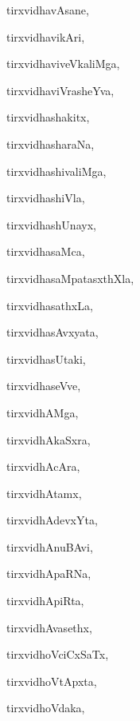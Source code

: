 \begin{multicols}{3}
{\noindent
{tirxvidhavAsane}, \pageref{tirxvidhavAsane}

\noindent
{tirxvidhavikAri}, \pageref{tirxvidhavikAri}

\noindent
{tirxvidhaviveVkaliMga}, \pageref{tirxvidhaviveVkaliMga}

\noindent
{tirxvidhaviVrasheYva}, \pageref{tirxvidhaviVrasheYva}

\noindent
{tirxvidhashakitx}, \pageref{tirxvidhashakitx}

\noindent
{tirxvidhasharaNa}, \pageref{tirxvidhasharaNa}

\noindent
{tirxvidhashivaliMga}, \pageref{tirxvidhashivaliMga}

\noindent
{tirxvidhashiVla}, \pageref{tirxvidhashiVla}

\noindent
{tirxvidhashUnayx}, \pageref{tirxvidhashUnayx}

\noindent
{tirxvidhasaMca}, \pageref{tirxvidhasaMca}

\noindent
{tirxvidhasaMpatasxthXla}, \pageref{tirxvidhasaMpatasxthXla}

\noindent
{tirxvidhasathxLa}, \pageref{tirxvidhasathxLa}

\noindent
{tirxvidhasAvxyata}, \pageref{tirxvidhasAvxyata}

\noindent
{tirxvidhasUtaki}, \pageref{tirxvidhasUtaki}

\noindent
{tirxvidhaseVve}, \pageref{tirxvidhaseVve}

\noindent
{tirxvidhAMga}, \pageref{tirxvidhAMga}

\noindent
{tirxvidhAkaSxra}, \pageref{tirxvidhAkaSxra}

\noindent
{tirxvidhAcAra}, \pageref{tirxvidhAcAra}

\noindent
{tirxvidhAtamx}, \pageref{tirxvidhAtamx}

\noindent
{tirxvidhAdevxYta}, \pageref{tirxvidhAdevxYta}

\noindent
{tirxvidhAnuBAvi}, \pageref{tirxvidhAnuBAvi}

\noindent
{tirxvidhApaRNa}, \pageref{tirxvidhApaRNa}

\noindent
{tirxvidhApiRta}, \pageref{tirxvidhApiRta}

\noindent
{tirxvidhAvasethx}, \pageref{tirxvidhAvasethx}

\noindent
{tirxvidhoVciCxSaTx}, \pageref{tirxvidhoVciCxSaTx}

\noindent
{tirxvidhoVtApxta}, \pageref{tirxvidhoVtApxta}

\noindent
{tirxvidhoVdaka}, \pageref{tirxvidhoVdaka}

}
\end{multicols}
